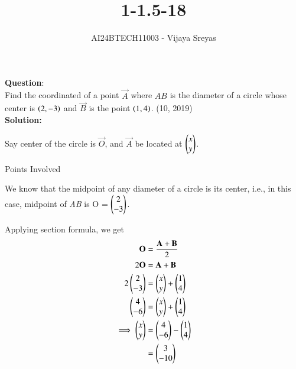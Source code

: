 \documentclass[journal]{IEEEtran}
\begin{document}

\vspace{3cm}

\title{1-1.5-18}
\author{AI24BTECH11003 - Vijaya Sreyas
}
{\let\newpage\relax\maketitle}

\renewcommand{\thefigure}{\theenumi}
\renewcommand{\thetable}{\theenumi}
\setlength{\intextsep}{10pt} %


\renewcommand{\thetable}{\theenumi}


\textbf{Question}:\\
Find the coordinated of a point $\vec{A}$ where $AB$ is the diameter of a circle whose center is $\left(2, -3\right)$ and $\vec{B}$ is the point $\left(1, 4\right)$. \hfill (10, 2019)\\

\textbf{Solution: }

Say center of the circle is $\vec{O}$, and $\vec{A}$ be located at $\begin{pmatrix}x \\ y\end{pmatrix}$.

\begin{table}[h!]    
  \centering
  
  \caption{Points Involved}
  \label{tab10.5.3.9.1}
\end{table}
We know that the midpoint of any diameter of a circle is its center, i.e., in this case, midpoint of \textit{AB} is O = $\begin{pmatrix}2 \\ -3\end{pmatrix}$.

Applying section formula, we get
\begin{align}
	\mathbf{O} &= \frac{\mathbf{A+B}}{2} \\
	2\mathbf{O} &= \mathbf{A+B} \\
	2 \begin{pmatrix}2 \\ -3\end{pmatrix} &= \begin{pmatrix}x \\ y\end{pmatrix} + \begin{pmatrix}1 \\ 4\end{pmatrix} \\
	\begin{pmatrix}4 \\ -6\end{pmatrix} &= \begin{pmatrix}x \\ y\end{pmatrix} + \begin{pmatrix}1 \\ 4\end{pmatrix} \\
	\implies \begin{pmatrix}x \\ y\end{pmatrix} &= \begin{pmatrix}4 \\ -6\end{pmatrix} - \begin{pmatrix}1 \\ 4\end{pmatrix} \\
	&= \begin{pmatrix}3 \\ -10\end{pmatrix}
\end{align}
\end{document}
